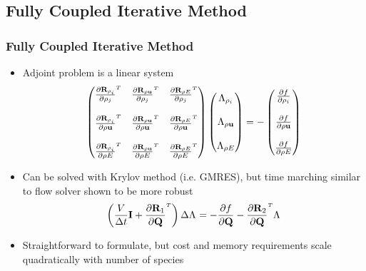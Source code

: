 \documentclass{beamer}
\begin{document}
\subsection{Fully Coupled Iterative Method}

\begin{frame}
  \frametitle{Fully Coupled Iterative Method}
  \begin{itemize}
    \item Adjoint problem is a linear system
      \begin{equation*}
        \begin{pmatrix}
          \rtdiff{\rho_i}{\rho_j} & 
          \rtdiff{\rho \vu}{\rho_j} & 
          \rtdiff{\rho E}{\rho_j} \\
          \\
          \rtdiff{\rho_i}{\rho \vu} & 
          \rtdiff{\rho \vu}{\rho \vu} & 
          \rtdiff{\rho E}{\rho \vu} \\
          \\
          \rtdiff{\rho_i}{\rho E} &
          \rtdiff{\rho \vu}{\rho E} &
          \rtdiff{\rho E}{\rho E}
        \end{pmatrix}
        \begin{pmatrix}
          \adjlam{\rho_i} \\ \\
          \adjlam{\rho \vu} \\ \\
          \adjlam{\rho E}
        \end{pmatrix}
        = -
        \begin{pmatrix}
          \pd{f}{\rho_i} \\ \\
          \pd{f}{\rho \vu} \\ \\
          \pd{f}{\rho E}
        \end{pmatrix}
      \end{equation*}
    \item Can be solved with Krylov method (i.e. GMRES), but time marching
      similar to flow solver shown to be more robust
      \begin{equation*}
        \left( \frac{V}{\Delta t} \mi + \rtdiff{1}{\mq} \right)
        \Delta \adjlam{}
        = -\pd{f}{\mq}
        - \rtdiff{2}{\mq} \adjlam{}
      \end{equation*}
    \item Straightforward to formulate, but cost and memory requirements
      scale quadratically with number of species
      
  \end{itemize}
\end{frame}
\end{document}
